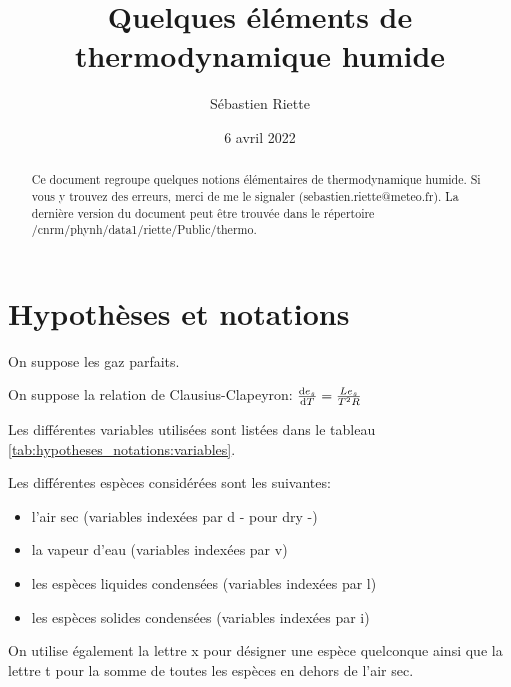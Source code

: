 \documentclass{article}
\title{Quelques éléments de thermodynamique humide}
\author{Sébastien Riette}
\date{6 avril 2022}
\begin{document}
\maketitle

\begin{abstract}
Ce document regroupe quelques notions élémentaires de thermodynamique humide.
Si vous y trouvez des erreurs, merci de me le signaler (sebastien.riette@meteo.fr).
La dernière version du document peut être trouvée dans le répertoire /cnrm/phynh/data1/riette/Public/thermo.
\end{abstract}

\tableofcontents

\section{Hypothèses et notations}
\label{sec:hypotheses_notations}
On suppose les gaz parfaits.

On suppose la relation de Clausius-Clapeyron: $\frac{{\rm d} e_s}{{\rm d} T}=\frac{L e_s}{T^2 R}$

Les différentes variables utilisées sont listées dans le tableau \ref{tab:hypotheses_notations:variables}.

Les différentes espèces considérées sont les suivantes:
\begin{itemize}
 \item l'air sec (variables indexées par d - pour dry -)
 \item la vapeur d'eau (variables indexées par v)
 \item les espèces liquides condensées (variables indexées par l)
 \item les espèces solides condensées (variables indexées par i)
\end{itemize}
On utilise également la lettre x pour désigner une espèce quelconque ainsi que la lettre t pour la somme de toutes les espèces en dehors de l'air sec.
\end{document}
